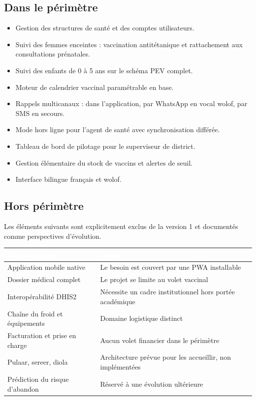 \documentclass[11pt,a4paper]{article}
\newcommand{\hd}[1]{\textcolor{white}{\sffamily\bfseries\small #1}}
\newcommand{\rowhead}{\rowcolor{primary}}
\begin{document}
\subsection{Dans le périmètre}

\begin{itemize}
  \item Gestion des structures de santé et des comptes utilisateurs.
  \item Suivi des femmes enceintes : vaccination antitétanique et rattachement aux
        consultations prénatales.
  \item Suivi des enfants de 0 à 5 ans sur le schéma PEV complet.
  \item Moteur de calendrier vaccinal paramétrable en base.
  \item Rappels multicanaux : dans l'application, par WhatsApp en vocal wolof, par SMS
        en secours.
  \item Mode hors ligne pour l'agent de santé avec synchronisation différée.
  \item Tableau de bord de pilotage pour le superviseur de district.
  \item Gestion élémentaire du stock de vaccins et alertes de seuil.
  \item Interface bilingue français et wolof.
\end{itemize}

\subsection{Hors périmètre}

Les éléments suivants sont explicitement exclus de la version 1 et documentés comme
perspectives d'évolution.

\noindent
\begin{tabularx}{\textwidth}{@{}R{6.4cm} L@{}}
\toprule
\rowhead \hd{Élément exclu} & \hd{Motif} \\
\midrule
Application mobile native & Le besoin est couvert par une PWA installable \\
Dossier médical complet & Le projet se limite au volet vaccinal \\
Interopérabilité DHIS2 & Nécessite un cadre institutionnel hors portée académique \\
Chaîne du froid et équipements & Domaine logistique distinct \\
Facturation et prise en charge & Aucun volet financier dans le périmètre \\
Pulaar, sereer, diola & Architecture prévue pour les accueillir, non implémentées \\
Prédiction du risque d'abandon & Réservé à une évolution ultérieure \\
\bottomrule
\end{tabularx}
\end{document}
